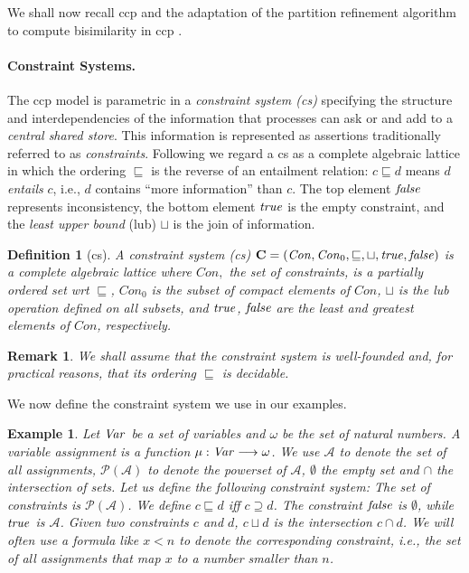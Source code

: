 \documentclass[copyright,creativecommons]{eptcs}
\newcommand{\true}{{\it true}}
\newcommand{\false}{{\it false}}
\newcommand{\Con}{\mathit{Con}}
\newtheorem{definition}{Definition}
\newtheorem{remark}{Remark}
\newtheorem{example}{Example}
\begin{document}
We shall now recall ccp and the adaptation
of the partition refinement algorithm to compute bisimilarity in ccp \cite{Aristizabal:12:SAC}.

\paragraph{Constraint Systems.} The ccp model is parametric in a \emph{constraint system (cs)} specifying the
structure and interdependencies of the information that processes can ask or
and add to a \emph{central shared store}.  This information is represented
as assertions traditionally referred to as \emph{constraints}. Following \cite{Boer:95:TCS, Mendler:95:NJC} we regard a cs as a
complete algebraic lattice in which the ordering $\sqsubseteq$ is the
reverse of an entailment relation: $c\sqsubseteq d$ means $d$
\emph{entails} $c$, i.e., $d$ contains ``more information'' than $c$.  The
top element $\false$ represents inconsistency, the bottom element $\true$
is the empty constraint, and the \emph{least upper bound} (lub) $\sqcup$
is the join of information. 



\begin{definition}[cs]\label{def:constraintsystem}
A \emph{constraint system (cs)}
$ \mathbf{C} = ({\Con},{\Con}_0,\sqsubseteq,\sqcup,\true,\false)$ is a complete algebraic lattice where ${\Con},$
the set of constraints, is a partially ordered set wrt
 $\sqsubseteq$, ${\Con}_0$ is the subset of \emph{compact} elements of
${\Con}$, $\sqcup$ is the lub operation defined on all subsets, and $\true$, $\false$ are
the least and greatest elements of ${\Con}$, respectively.
\end{definition}



\begin{remark}\label{rem:well-founded} We shall assume that the constraint system is well-founded and, for practical reasons, that its ordering $\sqsubseteq$ is decidable.
\end{remark}







We now define the constraint system we  use in our examples.

\begin{example}
 Let ${\it Var}$ be a set of variables and $\omega$ be the set of natural numbers.
A variable assignment is a function $\mu: {\it Var} \longrightarrow
\omega$. We use $\mathcal{A}$ to denote the set of all
assignments, ${\mathcal P}(\mathcal{A})$ to denote the powerset of $\mathcal{A}$, $\emptyset$ the empty set and $\cap$ the intersection of sets.
Let us define the following constraint system: The set of constraints is ${\mathcal P}(\mathcal{A})$. We define $c \sqsubseteq d$  iff  $c \supseteq d$. The constraint $\false$ is $\emptyset$, while $\true$ is
$\mathcal{A}$. Given two constraints $c$ and $d$, $c \sqcup d$ is
the intersection $c\cap d$. We will often
use a formula like $x<n$ to denote the corresponding constraint, i.e.,
the set of all assignments that map $x$ to a number smaller than $n$.
\end{example}
\end{document}
